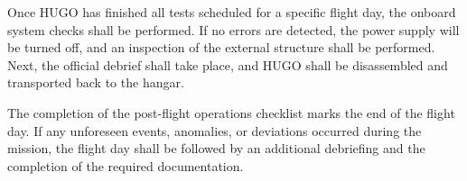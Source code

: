 Once HUGO has finished all tests scheduled for a specific flight day, the onboard system checks shall be performed. If no errors are detected, the power supply will be turned off, and an inspection of the external structure shall be performed. Next, the official debrief shall take place, and HUGO shall be disassembled and transported back to the hangar. 

The completion of the post-flight operations checklist marks the end of the flight day. If any unforeseen events, anomalies, or deviations occurred during the mission, the flight day shall be followed by an additional debriefing and the completion of the required documentation.


